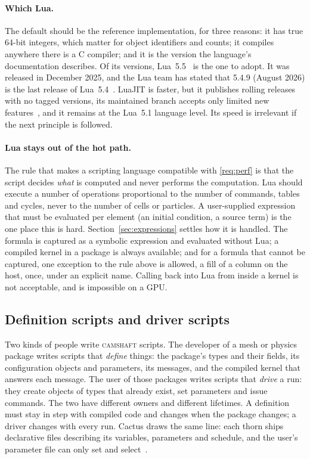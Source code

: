 \documentclass[11pt,a4paper]{article}
\newcommand{\camshaft}{\textsc{camshaft}}
\begin{document}
\paragraph{Which Lua.}  The default should be the reference implementation,
for three reasons: it has true 64-bit integers, which matter for object
identifiers and counts; it compiles anywhere there is a C compiler; and it is
the version the language's documentation describes.  Of its versions,
Lua~5.5~\cite{lua55} is the one to adopt.  It was released in December 2025,
and the Lua team has stated that 5.4.9 (August 2026) is the last release of
Lua~5.4~\cite{luaversions}.  LuaJIT is faster, but it publishes rolling
releases with no tagged versions, its maintained branch accepts only limited
new features~\cite{luajitstatus}, and it remains at the Lua~5.1 language
level.  Its speed is irrelevant if the next principle is followed.

\paragraph{Lua stays out of the hot path.}  The rule that makes a scripting
language compatible with \ref{req:perf} is that the script decides
\emph{what} is computed and never performs the computation.  Lua should
execute a number of operations proportional to the number of commands, tables
and cycles, never to the number of cells or particles.  A user-supplied
expression that must be evaluated per element (an initial condition, a source
term) is the one place this is hard.  Section~\ref{sec:expressions} settles
how it is handled.  The formula is captured as a symbolic expression and
evaluated without Lua; a compiled kernel in a package is always available;
and for a formula that cannot be captured, one exception to the rule above is
allowed, a fill of a column on the host, once, under an explicit name.
Calling back into Lua from inside a kernel is not acceptable, and is
impossible on a GPU.

\subsection{Definition scripts and driver scripts}
\label{sec:scripts}

Two kinds of people write \camshaft{} scripts.  The developer of a mesh or
physics package writes scripts that \emph{define} things: the package's types
and their fields, its configuration objects and parameters, its messages, and
the compiled kernel that answers each message.  The user of those packages
writes scripts that \emph{drive} a run: they create objects of types that
already exist, set parameters and issue commands.  The two have different
owners and different lifetimes.  A definition must stay in step with compiled
code and changes when the package changes; a driver changes with every run.
Cactus draws the same line: each thorn ships declarative files describing
its variables, parameters and schedule, and the user's parameter file can
only set and select~\cite{cactus}.
\end{document}
